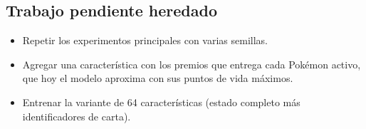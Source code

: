 \subsection{Trabajo pendiente heredado}

\begin{itemize}
  \item Repetir los experimentos principales con varias semillas.
  \item Agregar una caracter\'istica con los premios que entrega cada
        Pok\'emon activo, que hoy el modelo aproxima con sus puntos de vida
        m\'aximos.
  \item Entrenar la variante de 64 caracter\'isticas (estado completo m\'as
        identificadores de carta).
\end{itemize}